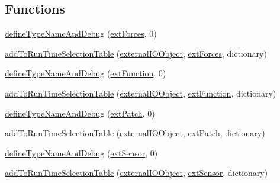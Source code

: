 \subsection*{Functions}
\begin{DoxyCompactItemize}
\item 
\hyperlink{namespaceFoam_1_1externalIOObject_aa716636efbf026c05e4390934a0b9ecd}{define\+Type\+Name\+And\+Debug} (\hyperlink{classFoam_1_1externalIOObject_1_1extForces}{ext\+Forces}, 0)
\item 
\hyperlink{namespaceFoam_1_1externalIOObject_abb139c69af1639328222e2af5a471632}{add\+To\+Run\+Time\+Selection\+Table} (\hyperlink{classFoam_1_1externalIOObject_1_1externalIOObject}{external\+I\+O\+Object}, \hyperlink{classFoam_1_1externalIOObject_1_1extForces}{ext\+Forces}, dictionary)
\item 
\hyperlink{namespaceFoam_1_1externalIOObject_afef08e61b202fd937be1eff61e044f51}{define\+Type\+Name\+And\+Debug} (\hyperlink{classFoam_1_1externalIOObject_1_1extFunction}{ext\+Function}, 0)
\item 
\hyperlink{namespaceFoam_1_1externalIOObject_a1c48333766ed4869b5285cbea993091d}{add\+To\+Run\+Time\+Selection\+Table} (\hyperlink{classFoam_1_1externalIOObject_1_1externalIOObject}{external\+I\+O\+Object}, \hyperlink{classFoam_1_1externalIOObject_1_1extFunction}{ext\+Function}, dictionary)
\item 
\hyperlink{namespaceFoam_1_1externalIOObject_a8c2ac9be711eb3f7a5834c9bd93c2431}{define\+Type\+Name\+And\+Debug} (\hyperlink{classFoam_1_1externalIOObject_1_1extPatch}{ext\+Patch}, 0)
\item 
\hyperlink{namespaceFoam_1_1externalIOObject_af6e782eb710b761f4c0d2cda89d0929b}{add\+To\+Run\+Time\+Selection\+Table} (\hyperlink{classFoam_1_1externalIOObject_1_1externalIOObject}{external\+I\+O\+Object}, \hyperlink{classFoam_1_1externalIOObject_1_1extPatch}{ext\+Patch}, dictionary)
\item 
\hyperlink{namespaceFoam_1_1externalIOObject_a493a5c04a4e6c9037e5c3741ba60f806}{define\+Type\+Name\+And\+Debug} (\hyperlink{classFoam_1_1externalIOObject_1_1extSensor}{ext\+Sensor}, 0)
\item 
\hyperlink{namespaceFoam_1_1externalIOObject_abd8cbdf792d2ab5074f4a2558bd0a720}{add\+To\+Run\+Time\+Selection\+Table} (\hyperlink{classFoam_1_1externalIOObject_1_1externalIOObject}{external\+I\+O\+Object}, \hyperlink{classFoam_1_1externalIOObject_1_1extSensor}{ext\+Sensor}, dictionary)
\end{DoxyCompactItemize}


